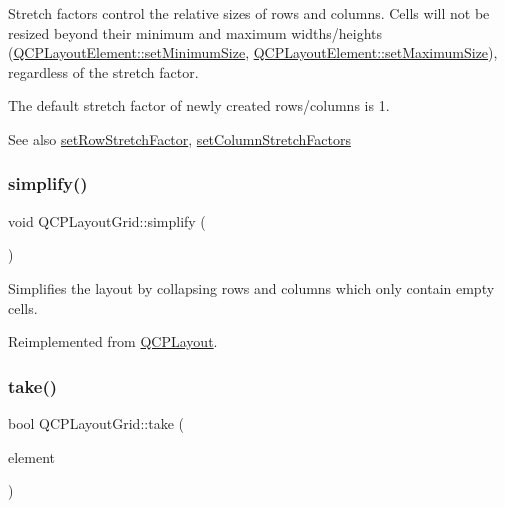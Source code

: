 Stretch factors control the relative sizes of rows and columns. Cells will not be resized beyond their minimum and maximum widths/heights (\mbox{\hyperlink{class_q_c_p_layout_element_a5dd29a3c8bc88440c97c06b67be7886b}{Q\+C\+P\+Layout\+Element\+::set\+Minimum\+Size}}, \mbox{\hyperlink{class_q_c_p_layout_element_a74eb5280a737ab44833d506db65efd95}{Q\+C\+P\+Layout\+Element\+::set\+Maximum\+Size}}), regardless of the stretch factor.

The default stretch factor of newly created rows/columns is 1.

\begin{DoxySeeAlso}{See also}
\mbox{\hyperlink{class_q_c_p_layout_grid_a7b0273de5369bd93d942edbaf5b166ec}{set\+Row\+Stretch\+Factor}}, \mbox{\hyperlink{class_q_c_p_layout_grid_a6c2591d1a7e2534ce036989543b49e57}{set\+Column\+Stretch\+Factors}} 
\end{DoxySeeAlso}
\mbox{\label{class_q_c_p_layout_grid_a08bba60e4acd20165526a8fd7f986b58}} 
\subsubsection{\texorpdfstring{simplify()}{simplify()}}
{\footnotesize\ttfamily void Q\+C\+P\+Layout\+Grid\+::simplify (\begin{DoxyParamCaption}{ }\end{DoxyParamCaption})\hspace{0.3cm}{\ttfamily [virtual]}}

Simplifies the layout by collapsing rows and columns which only contain empty cells. 

Reimplemented from \mbox{\hyperlink{class_q_c_p_layout_a41e6ac049143866e8f8b4964efab01b2}{Q\+C\+P\+Layout}}.

\mbox{\label{class_q_c_p_layout_grid_a666a9fe9e92054436f9b66eba25cca0c}} 
\subsubsection{\texorpdfstring{take()}{take()}}
{\footnotesize\ttfamily bool Q\+C\+P\+Layout\+Grid\+::take (\begin{DoxyParamCaption}\item[{\mbox{\hyperlink{class_q_c_p_layout_element}{Q\+C\+P\+Layout\+Element}} $\ast$}]{element }\end{DoxyParamCaption})\hspace{0.3cm}{\ttfamily [virtual]}}

